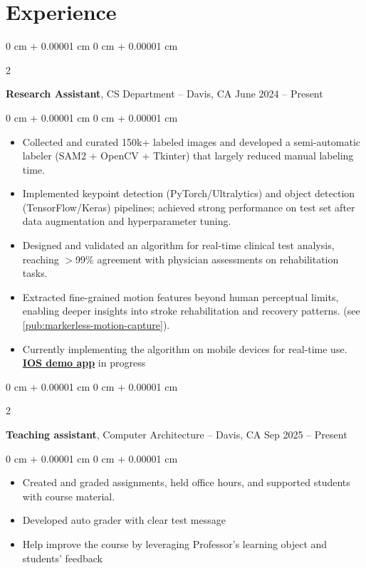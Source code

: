\documentclass[10pt, letterpaper]{article}
\newenvironment{highlights}{
    \begin{itemize}[
        topsep=0.10 cm,
        parsep=0.10 cm,
        partopsep=0pt,
        itemsep=0pt,
        leftmargin=0 cm + 10pt
    ]
}{
    \end{itemize}
} %
\newenvironment{onecolentry}{
    \begin{adjustwidth}{
        0 cm + 0.00001 cm
    }{
        0 cm + 0.00001 cm
    }
}{
    \end{adjustwidth}
} %
\newenvironment{twocolentry}[2][]{
    \onecolentry
    \def\secondColumn{#2}
    \setcolumnwidth{\fill, 6 cm}
    \begin{paracol}{2}
}{
    \switchcolumn \raggedleft \secondColumn
    \end{paracol}
    \endonecolentry
} %
\begin{document}
    
    \section{Experience}



        
        \begin{twocolentry}{
            June 2024 – Present
        }
            \textbf{Research Assistant}, CS Department -- Davis, CA\end{twocolentry}

        \vspace{0.10 cm}
        \begin{onecolentry}
            \begin{highlights}
                \item Collected and curated 150k+ labeled images and developed a semi-automatic labeler (SAM2 + OpenCV + Tkinter) that largely reduced manual labeling time.
                \item Implemented keypoint detection (PyTorch/Ultralytics) and object detection (TensorFlow/Keras) pipelines; achieved strong performance on test set after data augmentation and hyperparameter tuning.
                \item Designed and validated an algorithm for real-time clinical test analysis, reaching $>$99\% agreement with physician assessments on rehabilitation tasks.
                \item Extracted fine-grained motion features beyond human perceptual limits, enabling deeper insights into stroke rehabilitation and recovery patterns. (see \ref{pub:markerless-motion-capture}). 
                \item Currently implementing the algorithm on mobile devices for real-time use.  \href{https://github.com/AlundorZhu/CMORE-app}{\textbf{IOS demo app}} in progress
            \end{highlights}
        \end{onecolentry}

        \vspace{0.2 cm}

        \begin{twocolentry}{
            Sep 2025 – Present
        }
            \textbf{Teaching assistant}, Computer Architecture -- Davis, CA\end{twocolentry}

        \vspace{0.10 cm}
        \begin{onecolentry}
            \begin{highlights}
                \item Created and graded assignments, held office hours, and supported students with course material.
                \item Developed auto grader with clear test message
                \item Help improve the course by leveraging Professor's learning object and students' feedback

            \end{highlights}
        \end{onecolentry}
\end{document}

